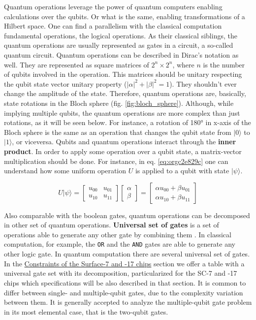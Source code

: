 \begin{itemize}
Quantum operations leverage the power of quantum computers enabling calculations over the qubits.
Or what is the same, enabling transformations of a Hilbert space.
One can find a parallelism with the classical computation fundamental operations, the logical operations.
As their classical siblings, the quantum operations are usually represented as gates in a circuit, a so-called quantum circuit.
Quantum operations can be described in Dirac's notation as well.
They are represented as square matrices of \(2^{n} \times 2^{n}\), where \(n\) is the number of qubits involved in the operation.
This matrices should be unitary respecting the qubit state vector unitary property (\(|\alpha|^2 + |\beta|^2 = 1\)).
They shouldn't ever change the amplitude of the state.
Therefore, quantum operations are, basically, state rotations in the Bloch sphere (fig. \ref{fig:bloch_sphere}).
Although, while implying multiple qubits, the quantum operations are more complex than just rotations, as it will be seen below.
For instance, a rotation of 180° in x-axis of the Bloch sphere is the same as an operation that changes the qubit state from \(| 0 \rangle\) to \(| 1 \rangle\), or viceversa.
Qubits and quantum operations interact through the \textbf{inner product}.
In order to apply some operation over a qubit state, a matrix-vector multiplication should be done.
For instance, in eq. \ref{eq:orgc2e829c} one can understand how some uniform operation \(U\) is applied to a qubit with state \(| \psi \rangle\).

\begin{equation}
\label{eq:orgc2e829c}
U |\psi\rangle=\begin{bmatrix}u_{00}&u_{01}\\u_{10}&u_{11}\end{bmatrix} \begin{bmatrix}\alpha \\ \beta \end{bmatrix} = \begin{bmatrix}\alpha u_{00} + \beta u_{01} \\ \alpha u_{10} + \beta u_{11} \end{bmatrix}
\end{equation}

Also comparable with the boolean gates, quantum operations can be decomposed in other set of quantum operations.
\textbf{Universal set of gates} is a set of operations able to generate any other gate by combining them \cite{Nielsen_2009}.
In classical computation, for example, the \texttt{OR} and the \texttt{AND} gates are able to generate any other logic gate.
In quantum computation there are several universal set of gates.
In the \href{chapter-3.org}{Constraints of the Surface-7 and -17 chips} section we offer a table with a universal gate set with its decomposition, particularized for the SC-7 and -17 chips which specifications will be also described in that section.
It is common to differ between single- and multiple-qubit gates, due to the complexity variation between them.
It is generally accepted to analyze the multiple-qubit gate problem in its most elemental case, that is the two-qubit gates.


\end{itemize}
